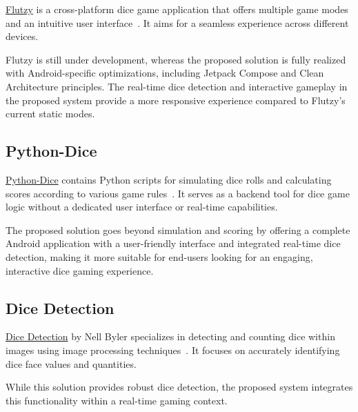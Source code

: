 \href{https://github.com/amuhaimin02/flutzy}{Flutzy} is a cross-platform dice game application that offers multiple game modes and an intuitive user interface~\cite{bib:flutzy}. It aims for a seamless experience across different devices.

Flutzy is still under development, whereas the proposed solution is fully realized with Android-specific optimizations, including Jetpack Compose and Clean Architecture principles. The real-time dice detection and interactive gameplay in the proposed system provide a more responsive experience compared to Flutzy’s current static modes.

\subsection{Python-Dice}

\href{https://github.com/jckuhl/Python-Dice}{Python-Dice} contains Python scripts for simulating dice rolls and calculating scores according to various game rules~\cite{bib:python-dice}. It serves as a backend tool for dice game logic without a dedicated user interface or real-time capabilities.

The proposed solution goes beyond simulation and scoring by offering a complete Android application with a user-friendly interface and integrated real-time dice detection, making it more suitable for end-users looking for an engaging, interactive dice gaming experience.

\subsection{Dice Detection}

\href{https://github.com/binaryshrey/Dice}{Dice Detection} by Nell Byler specializes in detecting and counting dice within images using image processing techniques~\cite{bib:nell-byler}. It focuses on accurately identifying dice face values and quantities.

While this solution provides robust dice detection, the proposed system integrates this functionality within a real-time gaming context.
